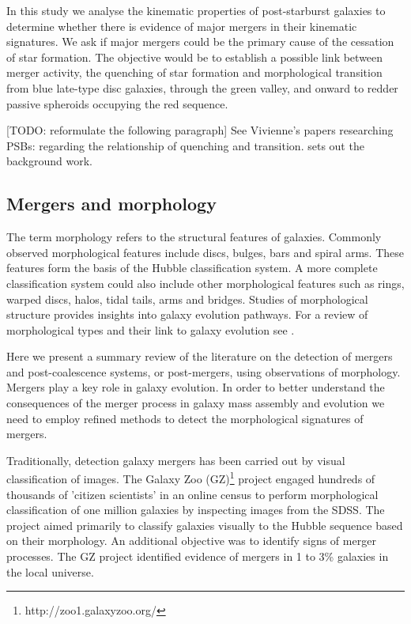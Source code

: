 In this study we analyse the kinematic properties of post-starburst galaxies to determine whether there is evidence of major mergers in their kinematic signatures. We ask if major mergers could be the primary cause of the cessation of star formation. The objective would be to establish a possible link between merger activity, the quenching of star formation and morphological transition from blue late-type disc galaxies, through the green valley, and onward to redder passive spheroids occupying the red sequence.

[TODO: reformulate the following paragraph] See Vivienne's  papers researching PSBs: \citet{2017MNRAS.472.1401A} regarding the relationship of quenching and transition. \citet{2016MNRAS.463..832W} sets out the background work.

\subsection{Mergers and morphology}
\label{sec:mergers}

The term morphology refers to the structural features of galaxies. Commonly observed morphological features include discs, bulges, bars and spiral arms. These features form the basis of the Hubble classification system. A more complete classification system could also include other morphological features such as rings, warped discs, halos, tidal tails, arms and bridges. Studies of  morphological structure provides insights into galaxy evolution pathways. For a review of morphological types and their link to galaxy evolution see \cite{2011arXiv1102.0550B}.

Here we present a summary review of the literature on the detection of mergers and post-coalescence systems, or post-mergers, using observations of morphology. Mergers play a key role in galaxy evolution. In order to better understand the consequences of the merger process in galaxy mass assembly and evolution we need to employ refined methods to detect the morphological signatures of mergers.

Traditionally, detection galaxy mergers has been carried out by visual classification of images. The Galaxy Zoo (GZ)\footnote{http://zoo1.galaxyzoo.org/} project \citet{10.1111/j.1365-2966.2008.13689.x,10.1111/j.1365-2966.2010.17432.x, 2017MNRAS.464.4176W} engaged hundreds of thousands of 'citizen scientists' in an online census to perform morphological classification of one million galaxies by inspecting images from the SDSS. The project aimed primarily to classify galaxies visually to the Hubble sequence based on their morphology. An additional objective was to identify signs of merger processes. The GZ project identified evidence of mergers in 1 to 3\% galaxies in the local universe.

